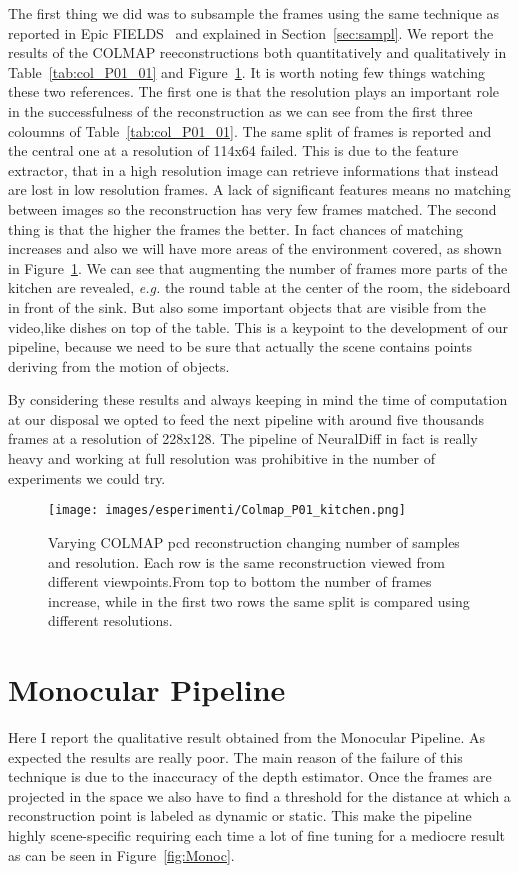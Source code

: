 The first thing we did was to subsample the frames using the same technique 
as reported in Epic FIELDS~\cite{epic_fields} and explained in Section~\ref{sec:sampl}.
We report the results of the COLMAP reeconstructions both quantitatively and qualitatively
in Table~\ref{tab:col_P01_01} and Figure~\ref{fig:colmap_P01}. It is worth noting
few things watching these two references. The first one is that the 
resolution plays an important role in the successfulness of the reconstruction as 
we can see from the first three coloumns of Table~\ref{tab:col_P01_01}. The same split
of frames is reported and the central one at a resolution of 114x64 failed. This 
is due to the feature extractor, that in a high resolution image can retrieve 
informations that instead are lost in low resolution frames. A lack of significant features 
means no matching between images so the reconstruction has very few frames matched.
The second thing is that the higher the frames the better. In fact chances of matching
increases and also we will have more areas of the environment covered, as shown in Figure~\ref{fig:colmap_P01}.
We can see that augmenting the number of frames more parts of the kitchen are revealed,
\textit{e.g.} the round table at the center of the room, the sideboard in front of the sink.
But also some important objects that are visible from the video,like dishes on top 
of the table. This is a keypoint to the development of our pipeline, because we need to 
be sure that actually the scene contains points deriving from the motion of objects.

By considering these results and always keeping in mind the time of computation at our disposal
we opted to feed the next pipeline with around five thousands frames at a resolution 
of 228x128. The pipeline of NeuralDiff in fact is really heavy and working at full resolution
was prohibitive in the number of experiments we could try.


\begin{figure}[H]
    \centering
    \texttt{[image: images/esperimenti/Colmap\_P01\_kitchen.png]} 
    \caption{Varying COLMAP pcd reconstruction changing number of samples and 
    resolution. Each row is the same reconstruction viewed from different viewpoints.From top to bottom the number of frames increase, while in the first
    two rows the same split is compared using different resolutions.}\label{fig:colmap_P01}
\end{figure}

\section{Monocular Pipeline}
Here I report the qualitative result obtained from the Monocular Pipeline. As expected the results are really poor.
The main reason of the failure of this technique is due to the inaccuracy of the depth estimator. Once the frames are 
projected in the space we also have to find a threshold for the distance at which a reconstruction point is labeled as 
dynamic or static. This make the pipeline highly scene-specific requiring each time a lot of fine tuning for a mediocre result as 
can be seen in Figure~\ref{fig:Monoc}.

